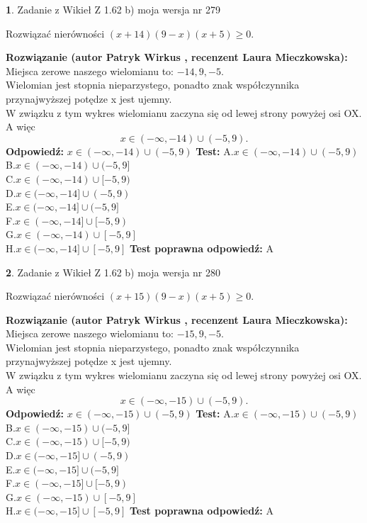 \documentclass[12pt, a4paper]{article}
\theoremstyle{definition} %
\newtheorem{zad}{}
\newcommand{\zadStart}[1]{\begin{zad}#1\newline}
\newcommand{\zadStop}{\end{zad}}
\newcommand{\rozwStart}[2]{\noindent \textbf{Rozwiązanie (autor #1 , recenzent #2): }\newline}
\newcommand{\rozwStop}{\newline}
\newcommand{\odpStart}{\noindent \textbf{Odpowiedź:}\newline}
\newcommand{\odpStop}{\newline}
\newcommand{\testStart}{\noindent \textbf{Test:}\newline}
\newcommand{\testStop}{\newline}
\newcommand{\kluczStart}{\noindent \textbf{Test poprawna odpowiedź:}\newline}
\newcommand{\kluczStop}{\newline}
\begin{document}
\zadStart{Zadanie z Wikieł Z 1.62 b) moja wersja nr 279}

Rozwiązać nierówności $(x+14)(9-x)(x+5)\ge0$.
\zadStop
\rozwStart{Patryk Wirkus}{Laura Mieczkowska}
Miejsca zerowe naszego wielomianu to: $-14, 9, -5$.\\
Wielomian jest stopnia nieparzystego, ponadto znak współczynnika przy\linebreak najwyższej potędze x jest ujemny.\\ W związku z tym wykres wielomianu zaczyna się od lewej strony powyżej osi OX. A więc $$x \in (-\infty,-14) \cup (-5,9).$$
\rozwStop
\odpStart
$x \in (-\infty,-14) \cup (-5,9)$
\odpStop
\testStart
A.$x \in (-\infty,-14) \cup (-5,9)$\\
B.$x \in (-\infty,-14) \cup (-5,9]$\\
C.$x \in (-\infty,-14) \cup [-5,9)$\\
D.$x \in (-\infty,-14] \cup (-5,9)$\\
E.$x \in (-\infty,-14] \cup (-5,9]$\\
F.$x \in (-\infty,-14] \cup [-5,9)$\\
G.$x \in (-\infty,-14) \cup [-5,9]$\\
H.$x \in (-\infty,-14] \cup [-5,9]$
\testStop
\kluczStart
A
\kluczStop



\zadStart{Zadanie z Wikieł Z 1.62 b) moja wersja nr 280}

Rozwiązać nierówności $(x+15)(9-x)(x+5)\ge0$.
\zadStop
\rozwStart{Patryk Wirkus}{Laura Mieczkowska}
Miejsca zerowe naszego wielomianu to: $-15, 9, -5$.\\
Wielomian jest stopnia nieparzystego, ponadto znak współczynnika przy\linebreak najwyższej potędze x jest ujemny.\\ W związku z tym wykres wielomianu zaczyna się od lewej strony powyżej osi OX. A więc $$x \in (-\infty,-15) \cup (-5,9).$$
\rozwStop
\odpStart
$x \in (-\infty,-15) \cup (-5,9)$
\odpStop
\testStart
A.$x \in (-\infty,-15) \cup (-5,9)$\\
B.$x \in (-\infty,-15) \cup (-5,9]$\\
C.$x \in (-\infty,-15) \cup [-5,9)$\\
D.$x \in (-\infty,-15] \cup (-5,9)$\\
E.$x \in (-\infty,-15] \cup (-5,9]$\\
F.$x \in (-\infty,-15] \cup [-5,9)$\\
G.$x \in (-\infty,-15) \cup [-5,9]$\\
H.$x \in (-\infty,-15] \cup [-5,9]$
\testStop
\kluczStart
A
\kluczStop
\end{document}
